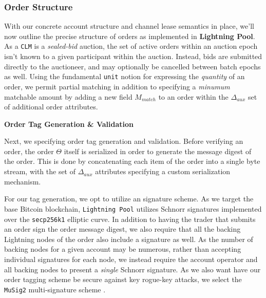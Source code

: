 \documentclass[10pt,a4paper]{article}
\theoremstyle{definition}
\begin{document}
\subsubsection{Order Structure}

With our concrete account structure and channel lease semantics in place, we'll
now outline the precise structure of orders as implemented in \textbf{Lightning
Pool}. As a \texttt{CLM} is a \emph{sealed-bid} auction, the set of active
orders within an auction epoch isn't known to a given participant within the
auction. Instead, bids are submitted directly to the auctioneer, and may
optionally be cancelled between batch epochs as well. Using the fundamental
\texttt{unit} notion for expressing the \emph{quantity} of an order, we permit
partial matching in addition to specifying a \emph{minumum} matchable amount by
adding a new field $M_{match}$ to an order within the $\Delta_{aux}$ set of
additional order attributes.


\begin{center}
    \textbf{Order Tag Generation \& Validation}
\end{center}

Next, we specifying order tag generation and validation. Before verifying an
order, the order $\Theta$ itself is serialized in order to generate the message
digest of the order.  This is done by concatenating each item of the order
into a single byte stream, with the set of $\Delta_{aux}$ attributes specifying
a custom serialization mechanism.

For our tag generation, we opt to utilize an \seufcma \enspace signature scheme. As we
target the base Bitcoin blockchain, \texttt{Lightning Pool} utilizes Schnorr
signatures implemented over the \texttt{secp256k1} elliptic curve. In addition
to having the trader that submits an order sign the order message digest, we
also require that all the backing Lightning nodes of the order also include a
signature as well.  As the number of backing nodes for a given account may be
numerous, rather than accepting individual signatures for each node, we instead
require the account operator and all backing nodes to present a \emph{single}
Schnorr signature. As we also want have our order tagging scheme be secure
against key rogue-key attacks, we select the \texttt{MuSig2} multi-signature
scheme \cite{muSig}. \\
\end{document}
